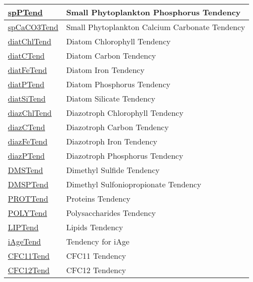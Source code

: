 {\begin{center}
\begin{longtable}{| p{2.0in} | p{4.0in} |}
    \hline
    \hyperref[subsec:var_sec_tend_spPTend]{spPTend} & Small Phytoplankton Phosphorus Tendency \\
    \hline
    \hyperref[subsec:var_sec_tend_spCaCO3Tend]{spCaCO3Tend} & Small Phytoplankton Calcium Carbonate Tendency \\
    \hline
    \hyperref[subsec:var_sec_tend_diatChlTend]{diatChlTend} & Diatom Chlorophyll Tendency \\
    \hline
    \hyperref[subsec:var_sec_tend_diatCTend]{diatCTend} & Diatom Carbon Tendency \\
    \hline
    \hyperref[subsec:var_sec_tend_diatFeTend]{diatFeTend} & Diatom Iron Tendency \\
    \hline
    \hyperref[subsec:var_sec_tend_diatPTend]{diatPTend} & Diatom Phosphorus Tendency \\
    \hline
    \hyperref[subsec:var_sec_tend_diatSiTend]{diatSiTend} & Diatom Silicate Tendency \\
    \hline
    \hyperref[subsec:var_sec_tend_diazChlTend]{diazChlTend} & Diazotroph Chlorophyll Tendency \\
    \hline
    \hyperref[subsec:var_sec_tend_diazCTend]{diazCTend} & Diazotroph Carbon Tendency \\
    \hline
    \hyperref[subsec:var_sec_tend_diazFeTend]{diazFeTend} & Diazotroph Iron Tendency \\
    \hline
    \hyperref[subsec:var_sec_tend_diazPTend]{diazPTend} & Diazotroph Phosphorus Tendency \\
    \hline
    \hyperref[subsec:var_sec_tend_DMSTend]{DMSTend} & Dimethyl Sulfide Tendency \\
    \hline
    \hyperref[subsec:var_sec_tend_DMSPTend]{DMSPTend} & Dimethyl Sulfoniopropionate Tendency \\
    \hline
    \hyperref[subsec:var_sec_tend_PROTTend]{PROTTend} & Proteins Tendency \\
    \hline
    \hyperref[subsec:var_sec_tend_POLYTend]{POLYTend} & Polysaccharides Tendency \\
    \hline
    \hyperref[subsec:var_sec_tend_LIPTend]{LIPTend} & Lipids Tendency \\
    \hline
    \hyperref[subsec:var_sec_tend_iAgeTend]{iAgeTend} & Tendency for iAge \\
    \hline
    \hyperref[subsec:var_sec_tend_CFC11Tend]{CFC11Tend} & CFC11 Tendency \\
    \hline
    \hyperref[subsec:var_sec_tend_CFC12Tend]{CFC12Tend} & CFC12 Tendency \\
    \hline
\end{longtable}
\end{center}
}
